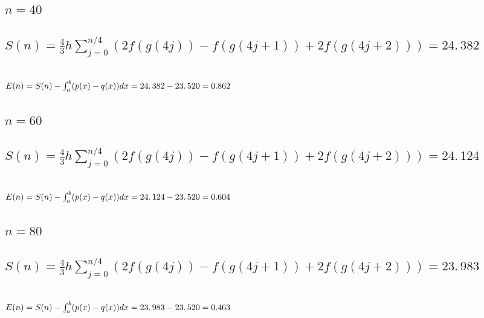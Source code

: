 \documentclass{article}
\begin{document}
\subsection{$n=40$}

\subsection{$S(n)=\frac{4}{3}h\sum%
\limits_{j=0}^{n/4}(2f(g(4j))-f(g(4j+1))+2f(g(4j+2)))=\allowbreak
24.\,\allowbreak 382$}

\subsection{$E(n)=S(n)-\protect\int_{a}^{b}(p(x)-q(x))dx\allowbreak
=\allowbreak \allowbreak 24.\,\allowbreak 382-23.\,\allowbreak
520=\allowbreak 0.862\,$}

\bigskip

\subsection{$n=60$}

\subsection{$S(n)=\frac{4}{3}h\sum%
\limits_{j=0}^{n/4}(2f(g(4j))-f(g(4j+1))+2f(g(4j+2)))=24.\,\allowbreak 124$}

\subsection{$E(n)=S(n)-\protect\int_{a}^{b}(p(x)-q(x))dx\allowbreak
=\allowbreak \allowbreak 24.\,\allowbreak 124-23.\,\allowbreak
520=\allowbreak 0.604\,$}

\bigskip

\subsection{$n=80$}

\subsection{$S(n)=\frac{4}{3}h\sum%
\limits_{j=0}^{n/4}(2f(g(4j))-f(g(4j+1))+2f(g(4j+2)))=23.\,\allowbreak 983$}

\subsection{\protect\bigskip $E(n)=S(n)-\protect\int_{a}^{b}(p(x)-q(x))dx%
\allowbreak =23.\,\allowbreak 983-23.\,\allowbreak 520=\allowbreak 0.463\,$}
\end{document}
